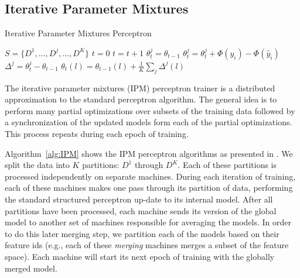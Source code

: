 \documentclass[a4paper]{article}
\begin{document}
\subsection{Iterative Parameter Mixtures}
\begin{algorithm}[h]
\scriptsize
\caption{Iterative Parameter Mixtures Perceptron}
\label{alg:IPM}
\begin{algorithmic}
  \State {}
  \State $S=\{D^{1},\ldots,D^{j},\ldots,D^{K}\}$ 
  \State $t=0$
  \Repeat
    \State $t=t+1$
     
      \State $\theta_{t}^{j}=\theta_{t-1}$
          \State {}
          \State $\theta_{t}^{j}=\theta_{t}^{j}+\Phi(y_{i})-\Phi(\hat{y}_{i})$
        \EndIf
      \EndFor
      \State $\Delta^{j}=\theta_{t}^{j}-\theta_{t-1}$
    \EndFor
     
      \State $\theta_{t}(l)=\theta_{t-1}(l)+\frac{1}{K}\sum_{j}\Delta^{j}(l)$
    \EndFor
   \end{algorithmic} 
\normalsize
\end{algorithm}

The iterative parameter mixtures (IPM) perceptron trainer is a distributed
approximation to the standard perceptron algorithm. The general idea
is to perform many partial optimizations over subsets of the training
data followed by a synchronization of the updated models form each of
the partial optimizations.  This process repeats during each epoch of training.

Algorithm~\ref{alg:IPM} shows the IPM perceptron algorithms as presented
in \cite{mcdonald10distributed}. We split the data into $K$
partitions: $D^{1}$ through $D^{K}$. Each of these
partitions is processed independently on separate machines. During each iteration
of training, each of these machines makes one pass through its partition
of data, performing the standard structured perceptron up-date to its internal
model.  After all partitions have been processed, each machine sends its
version of the global model to another set of machines responsible for averaging
the models.  In order to do this later
merging step, we partition each of the models based on their feature ids (e.g.,
each of these \emph{merging} machines merges a subset of the feature space).
Each machine will start its next epoch of training with the globally merged
model.
\end{document}
